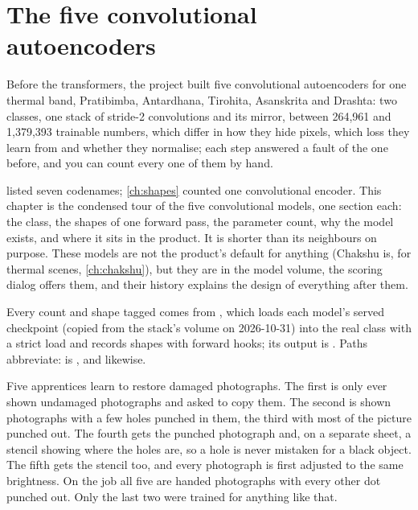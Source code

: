\chapter{The five convolutional autoencoders}\label{ch:convae}

\begin{onething}
Before the transformers, the project built five convolutional autoencoders for one thermal band, Pratibimba,
Antardhana, Tirohita, Asanskrita and Drashta: two classes, one stack of stride-2 convolutions and its mirror, between
264,961 and 1,379,393 trainable numbers, which differ in how they hide pixels, which loss they learn from and whether
they normalise; each step answered a fault of the one before, and you can count every one of them by hand.
\end{onething}

 listed seven codenames; \cref{ch:shapes} counted one convolutional encoder. This chapter is the
condensed tour of the five convolutional models, one section each: the class, the shapes of one forward pass, the
parameter count, why the model exists, and where it sits in the product. It is shorter than its neighbours on
purpose. These models are not the product's default for anything (Chakshu is, for thermal scenes,
\cref{ch:chakshu}), but they are in the model volume, the scoring dialog offers them, and their history explains the
design of everything after them.

Every count and shape tagged \tagC{} comes from , which loads each
model's served checkpoint (copied from the stack's  volume on 2026-10-31) into the real class with a
strict load and records shapes with forward hooks; its output is . Paths abbreviate:
 is ,  and  likewise.

\begin{analogy}
Five apprentices learn to restore damaged photographs. The first is only ever shown undamaged photographs and asked
to copy them. The second is shown photographs with a few holes punched in them, the third with most of the picture
punched out. The fourth gets the punched photograph and, on a separate sheet, a stencil showing where the holes are,
so a hole is never mistaken for a black object. The fifth gets the stencil too, and every photograph is first
adjusted to the same brightness. On the job all five are handed photographs with every other dot punched out. Only
the last two were trained for anything like that.
\end{analogy}

